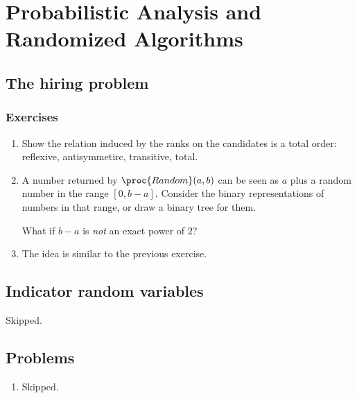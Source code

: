 \setcounter{chapter}{4}
\chapter{Probabilistic Analysis and Randomized Algorithms}
\section{The hiring problem}
\subsection*{Exercises}
\begin{enumerate}[\thesection-1]
%
\item Show the relation induced by the ranks on the candidates is a total order: reflexive, antisymmetirc, transitive, total.
%
\item A number returned by $\proc{Random}(a, b)$ can be seen as $a$ plus a random number in the range $[0, b - a]$. Consider the binary representations of numbers in that range, or draw a binary tree for them.
\begin{remark}
What if $b - a$ is \emph{not} an exact power of $2$?
\end{remark}
%
\item The idea is similar to the previous exercise.
%
\end{enumerate}

\section{Indicator random variables}
Skipped.

\section*{Problems}
\begin{enumerate}[\thechapter-1]
%
\item Skipped.
%
\end{enumerate}